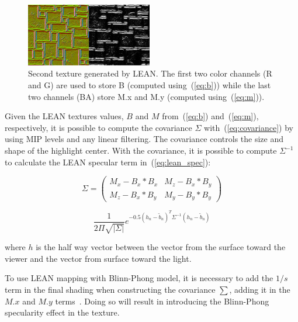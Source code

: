 \documentclass[10pt, conference]{IEEEtran}
\begin{document}
\begin{figure}[here]
	\includegraphics[width=0.49\textwidth]{figs/Lean2.png}
	\caption{Second texture generated by LEAN. The first two color channels (R and G) are used to store B (computed using~(\ref{eq:b})) while the last two channels (BA) store M.x and M.y (computed using~(\ref{eq:m})).}
	\label{fig:Lean2}
\end{figure}

Given the LEAN textures values, $B$ and $M$ from~(\ref{eq:b}) and~(\ref{eq:m}), respectively, it is possible to compute the covariance $\Sigma$ with~(\ref{eq:covariance}) by using MIP levels and any linear filtering. The covariance controls the size and shape of the highlight center. With the covariance, it is possible to compute $\Sigma^{-1}$ to calculate the LEAN specular term in~(\ref{eq:lean_spec}):

\begin{equation}
	\label{eq:covariance}
	\Sigma = \left( \begin{smallmatrix} M_{x} - B_{x} * B_{x} & M_{z} - B_{x} * B_{y}\\ M_{z} - B_{x} * B_{y} & M_{y} - B_{y} * B_{y} \end{smallmatrix} \right)
\end{equation}

\begin{equation}
	\label{eq:lean_spec}
	\dfrac{1}{2\Pi\sqrt{|\Sigma|}}e^{-0.5(h_{n} - \tilde{b}_{n})^{T} \Sigma^{-1}(h_{n} - \tilde{b}_{n})}
\end{equation}

where $h$ is the half way vector between the vector from the surface toward the viewer and the vector from surface toward the light.

To use LEAN mapping with Blinn-Phong model, it is necessary to add the $1 / s$ term in the final shading when constructing the covariance $∑$, adding it in the $M.x$ and $M.y$ terms~\cite{Olano:2010:LM:1730804.1730834}. Doing so will result in introducing the Blinn-Phong specularity effect in the texture.
\end{document}
